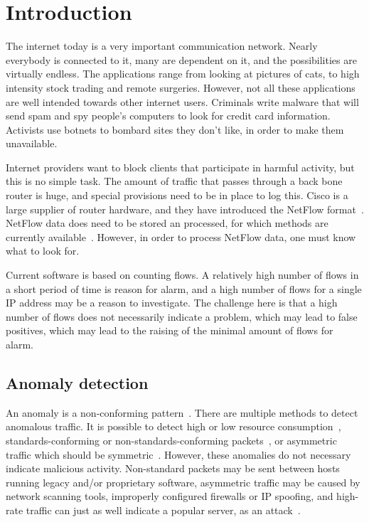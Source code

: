 \chapter{Introduction}
\label{chp:introduction} 

The internet today is a very important communication network.
Nearly everybody is connected to it, many are dependent on it,
 and the possibilities are virtually endless.
The applications range from looking at pictures of cats, to high intensity stock trading and remote surgeries.
However, not all these applications are well intended towards other internet users.
Criminals write malware that will send spam and spy people's computers to look for credit card information.
Activists use botnets to bombard sites they don't like, in order to make them unavailable.

Internet providers want to block clients that participate in harmful activity,
 but this is no simple task.
The amount of traffic that passes through a back bone router is huge,
 and special provisions need to be in place to log this.
Cisco is a large supplier of router hardware, and they have introduced the NetFlow format~\cite{cisco0netflow}.
NetFlow data does need to be stored an processed, for which methods are currently available~\cite{Morken352472}.
However, in order to process NetFlow data, one must know what to look for.

Current software is based on counting flows.
A relatively high number of flows in a short period of time is reason for alarm,
 and a high number of flows for a single IP address may be a reason to investigate.
The challenge here is that a high number of flows does not necessarily indicate a problem,
 which may lead to false positives, which may lead to the raising of the minimal amount of flows for alarm.


\section{Anomaly detection}
An anomaly is a non-conforming pattern~\cite{Chandola:2009:ADS:1541880.1541882}.
There are multiple methods to detect anomalous traffic.
It is possible to detect high or low resource consumption~\cite{lan2003effect}, standards-conforming or non-standards-conforming packets~\cite{john2008detection}, or asymmetric traffic which should be symmetric~\cite{kreibich2005using}.
However, these anomalies do not necessary indicate malicious activity.
Non-standard packets may be sent between hosts running legacy and/or proprietary software,
asymmetric traffic may be caused by network scanning tools, improperly configured firewalls or IP spoofing,
and high-rate traffic can just as well indicate a popular server, as an attack~\cite{gao2006differentiating}.

